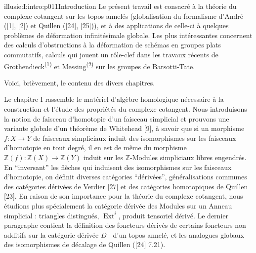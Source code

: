 \IllusieSetPhysicalPageSize{450.6bp}{704bp}
\begin{illusiefrontpage}{illusie:I:intro:p011}{Introduction}
\hypertarget{illusie:I:intro}{}\hypertarget{illusie:I:intro:p011:p1}{}%
Le présent travail est consacré à la théorie du complexe cotangent sur les topos
annelés (globalisation du formalisme d'André ([1], [2]) et Quillen ([24], [25])),
et à des applications de celle-ci à quelques problèmes de déformation
infinitésimale globale. Les plus intéressantes concernent des calculs d'obstructions
à la déformation de schémas en groupes plats commutatifs, calculs qui jouent un
rôle-clef dans les travaux récents de Grothendieck\textsuperscript{(1)} et
Messing\textsuperscript{(2)} sur les groupes de Barsotti-Tate.

\vspace{4bp}
\hypertarget{illusie:I:intro:p011:p2}{}%
Voici, brièvement, le contenu des divers chapitres.

\vspace{4bp}
\hypertarget{illusie:I:intro:p011:p3}{}%
Le chapitre I rassemble le matériel d'algèbre homologique nécessaire à la
construction et l'étude des propriétés du complexe cotangent. Nous introduisons la
notion de faisceau d'homotopie d'un faisceau simplicial et prouvons une variante
globale d'un théorème de Whitehead [9], à savoir que si un morphisme
$f:X\longrightarrow Y$ de faisceaux simpliciaux induit des isomorphismes sur les
faisceaux d'homotopie en tout degré, il en est de même du morphisme
$\mathbb Z(f):\mathbb Z(X)\longrightarrow\mathbb Z(Y)$ induit sur les
$\mathbb Z$-Modules simpliciaux libres engendrés. En ``inversant'' les flèches qui
induisent des isomorphismes sur les faisceaux d'homotopie, on définit diverses
catégories ``dérivées'', généralisations communes des catégories dérivées de
Verdier [27] et des catégories homotopiques de Quillen [23]. En raison de son
importance pour la théorie du complexe cotangent, nous étudions plus spécialement
la catégorie dérivée des Modules sur un Anneau simplicial : triangles distingués,
$\operatorname{Ext}^{i}$, produit tensoriel dérivé. Le dernier paragraphe contient
la définition des foncteurs dérivés de certains foncteurs non additifs sur la
catégorie dérivée $D^{-}$ d'un topos annelé, et les analogues globaux des
isomorphismes de décalage de Quillen ([24] 7.21).

\IllusieNoteRule
{}\hypertarget{illusie:I:intro:p011:n1}{}%
\hypertarget{illusie:I:intro:p011:n2}{}%
\end{illusiefrontpage}

